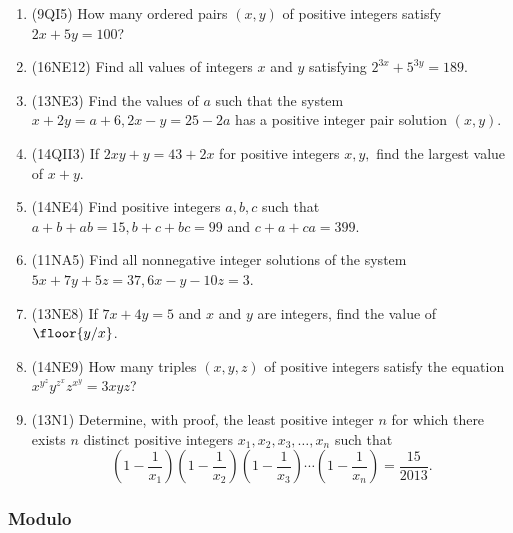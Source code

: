 \documentclass[10pt,paper=letter]{scrartcl}
\begin{document}
\begin{enumerate}

\item (9QI5) How many ordered pairs $(x, y)$ of positive integers satisfy $2x + 5y = 100$?

\item (16NE12) Find all values of integers $x$ and $y$ satisfying $2^{3x} + 5^{3y} = 189$.

\item (13NE3) Find the values of $a$ such that the system $x+2y = a+6, 2x - y = 25-2a$ has a positive integer pair solution $(x, y)$.

\item (14QII3) If $2xy + y = 43 + 2x$ for positive integers $x, y,$ find the largest value of $x + y$.

\item (14NE4) Find positive integers $a, b, c$ such that $a + b + ab = 15, b + c + bc = 99$ and $c + a + ca = 399$.

\item (11NA5) Find all nonnegative integer solutions of the system $5x+7y+5z=37, 6x-y-10z=3$.

\item (13NE8) If $7x + 4y = 5$ and $x$ and $y$ are integers, find the value of $\floor{y/x}$.

\item (14NE9) How many triples $(x, y, z)$ of positive integers satisfy the equation $x^{y^z} y^{z^x} z^{x^y} = 3xyz$?

\item (13N1) Determine, with proof, the least positive integer $n$ for which there exists $n$ distinct positive integers $x_1, x_2, x_3, \ldots, x_n$ such that $$\left(1- \frac{1}{x_1}\right) \left(1-\frac{1}{x_2}\right) \left(1 - \frac{1}{x_3} \right) \cdots \left(1 - \frac{1}{x_n}\right) = \frac{15}{2013}.$$

\end{enumerate}

\subsubsection*{Modulo}
\end{document}
